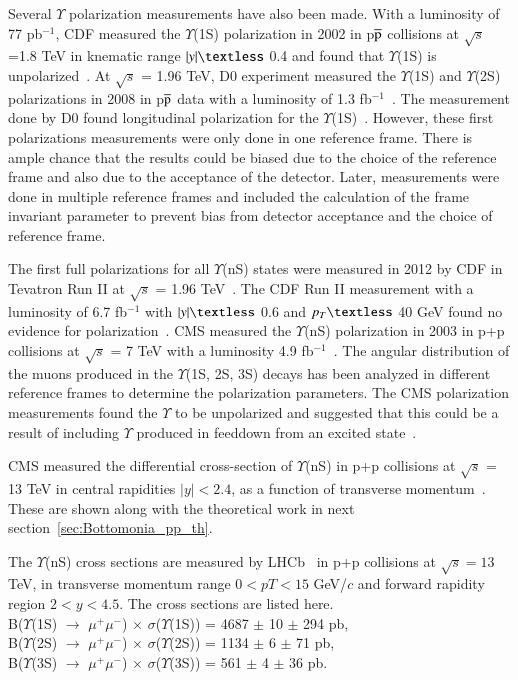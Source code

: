 Several $\Upsilon$ polarization measurements have also been made. With a luminosity
of 77 pb$^{-1}$, CDF measured the $\Upsilon$(1S) polarization in 2002 in 
p$\overline{\rm p}$ collisions at $\surd s$ =1.8 TeV in knematic range
$|y|\textless$ 0.4 and found that $\Upsilon$(1S) is unpolarized~\cite{CDF:2001fdy}.
At $\surd s$  = 1.96 TeV, D0 experiment measured the $\Upsilon$(1S) and
$\Upsilon$(2S) polarizations in 2008 in p$\overline{\rm p}$ data
with a luminosity of 1.3 fb$^{-1}$~\cite{D0:2008yos}. The measurement done by D0 found
longitudinal polarization for the $\Upsilon$(1S)~\cite{D0:2008yos}.
However, these first polarizations
measurements were only done in one reference frame.  There is ample chance that the results could be biased due to the choice
of the reference frame and also due to the acceptance of the detector. Later, measurements were done in multiple
reference frames and included the calculation of the frame invariant parameter to
prevent bias from detector acceptance and the choice of reference frame.


The first full polarizations for all $\Upsilon$(nS) states were measured in 2012 by
CDF in Tevatron Run II at $\surd s$  = 1.96 TeV~\cite{CDF:2011ag}.
The CDF Run II measurement with a luminosity of 6.7 fb$^{-1}$
with $|y|\textless$ 0.6 and $p_{T}\textless$ 40 GeV found no evidence for
polarization~\cite{CDF:2011ag}.
CMS measured the $\Upsilon$(nS) polarization in 2003 in p+p collisions
at $\surd s$  = 7 TeV with a luminosity 4.9 fb$^{-1}$~\cite{CMS:2012bpf}.
The angular distribution of the muons produced in the $\Upsilon$(1S, 2S, 3S)
decays has been analyzed in different reference frames to determine the
polarization parameters.
The CMS polarization measurements found the $\Upsilon$
to be unpolarized and suggested that this could be a result of including
$\Upsilon$ produced in feeddown from an excited state~\cite{CMS:2012bpf}.

CMS measured the differential cross-section of $\Upsilon$(nS)
in p+p collisions at $\sqrt{s}$ = 13 TeV in central rapidities $|y|<2.4$,
as a function of transverse momentum~\cite{CMS:2017dju}. These are
shown along with the theoretical work in next section~\ref{sec:Bottomonia_pp_th}.

The $\Upsilon$(nS) cross sections are measured by LHCb~\cite{LHCb:2018yzj}
in p+p collisions at $\sqrt{s}=13$ TeV, in transverse momentum
range $0 < pT < 15$ GeV/$c$ and forward rapidity region $2 < y < 4.5$.
The cross sections are listed here. \\
B($\Upsilon$(1S) $\rightarrow$ $\mu^+\mu^-$) $\times$ $\sigma$($\Upsilon$(1S)) = 4687 $\pm$ 10 $\pm$ 294 pb,\\
B($\Upsilon$(2S) $\rightarrow$ $\mu^+\mu^-$) $\times$ $\sigma$($\Upsilon$(2S)) = 1134 $\pm$ 6 $\pm$ 71 pb, \\
B($\Upsilon$(3S) $\rightarrow$ $\mu^+\mu^-$) $\times$ $\sigma$($\Upsilon$(3S)) = 561 $\pm$ 4 $\pm$ 36 pb. 


